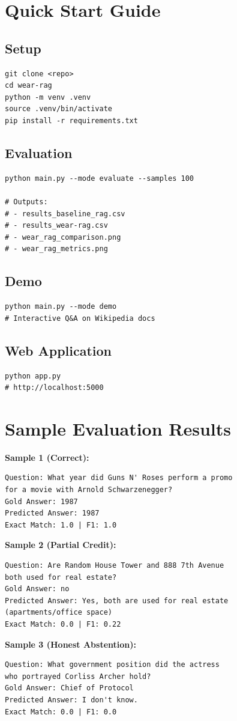 \documentclass[twocolumn,11pt]{article}
\begin{document}
\section{Quick Start Guide}

\subsection{Setup}
\begin{verbatim}
git clone <repo>
cd wear-rag
python -m venv .venv
source .venv/bin/activate
pip install -r requirements.txt
\end{verbatim}

\subsection{Evaluation}
\begin{verbatim}
python main.py --mode evaluate --samples 100

# Outputs:
# - results_baseline_rag.csv
# - results_wear-rag.csv
# - wear_rag_comparison.png
# - wear_rag_metrics.png
\end{verbatim}

\subsection{Demo}
\begin{verbatim}
python main.py --mode demo
# Interactive Q&A on Wikipedia docs
\end{verbatim}

\subsection{Web Application}
\begin{verbatim}
python app.py
# http://localhost:5000
\end{verbatim}

\section{Sample Evaluation Results}

\textbf{Sample 1 (Correct):}
\begin{verbatim}
Question: What year did Guns N' Roses perform a promo 
for a movie with Arnold Schwarzenegger?
Gold Answer: 1987
Predicted Answer: 1987
Exact Match: 1.0 | F1: 1.0
\end{verbatim}

\textbf{Sample 2 (Partial Credit):}
\begin{verbatim}
Question: Are Random House Tower and 888 7th Avenue 
both used for real estate?
Gold Answer: no
Predicted Answer: Yes, both are used for real estate 
(apartments/office space)
Exact Match: 0.0 | F1: 0.22
\end{verbatim}

\textbf{Sample 3 (Honest Abstention):}
\begin{verbatim}
Question: What government position did the actress 
who portrayed Corliss Archer hold?
Gold Answer: Chief of Protocol
Predicted Answer: I don't know.
Exact Match: 0.0 | F1: 0.0
\end{verbatim}
\end{document}
